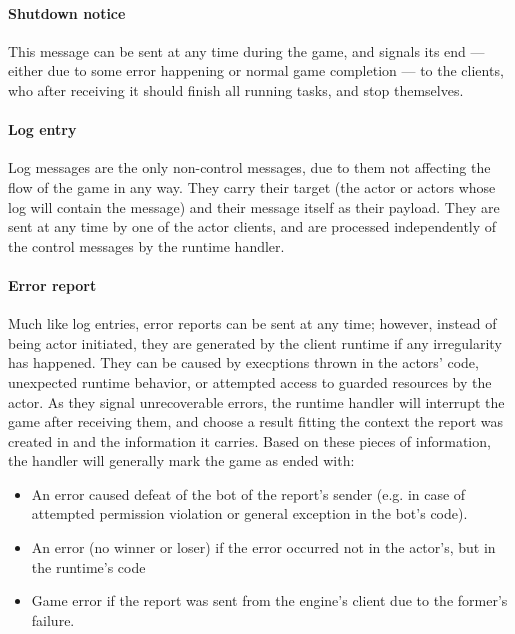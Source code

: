 			\paragraph{Shutdown notice}
			
			This message can be sent at any time during the game, and signals its end --- either due to some error happening or normal game completion --- to the clients, who after receiving it should finish all running tasks, and stop themselves.
		
			\paragraph{Log entry}
			
			Log messages are the only non-control messages, due to them not affecting the flow of the game in any way. They carry their target (the actor or actors whose log will contain the message) and their message itself as their payload. They are sent at any time by one of the actor clients, and are processed independently of the control messages by the runtime handler.
			
			\paragraph{Error report}
			
			Much like log entries, error reports can be sent at any time; however, instead of being actor initiated, they are generated by the client runtime if any irregularity has happened. They can be caused by execptions thrown in the actors' code, unexpected runtime behavior, or attempted access to guarded resources by the actor. As they signal unrecoverable errors, the runtime handler will interrupt the game after receiving them, and choose a result fitting the context the report was created in and the information it carries.
			Based on these pieces of information, the handler will generally mark the game as ended with:
			
			\begin{itemize}
				\item An error caused defeat of the bot of the report's sender (e.g. in case of attempted permission violation or general exception in the bot's code).
				
				\item An error (no winner or loser) if the error occurred not in the actor's, but in the runtime's code
				
				\item Game error if the report was sent from the engine's client due to the former's failure. 
			\end{itemize}
			
